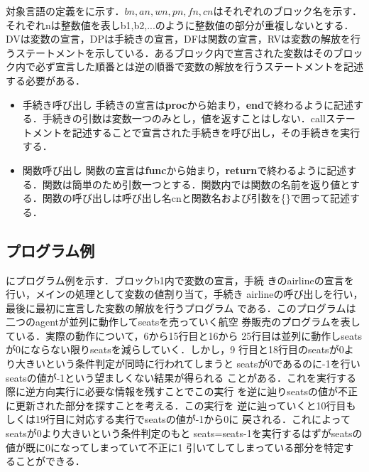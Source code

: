 \documentclass[submit,PRO]{ipsj}
\begin{document}
対象言語の定義をに示す．$bn,an,wn,pn,fn,cn$はそれぞれのブロック名を示す．それぞれnは整数値を表しb1,b2,...のように整数値の部分が重複しないとする．DVは変数の宣言，DPは手続きの宣言，DFは関数の宣言，RVは変数の解放を行うステートメントを示している．あるブロック内で宣言された変数はそのブロック内で必ず宣言した順番とは逆の順番で変数の解放を行うステートメントを記述する必要がある．

\begin{itemize}
\item
手続き呼び出し  手続きの宣言は{\bf proc}から始まり，{\bf end}で終わるように記述する．手続きの引数は変数一つのみとし，値を返すことはしない．callステートメントを記述することで宣言された手続きを呼び出し，その手続きを実行する．
\item
関数呼び出し  関数の宣言は{\bf func}から始まり，{\bf return}で終わるように記述する．関数は簡単のため引数一つとする．関数内では関数の名前を返り値とする．関数の呼び出しは呼び出し名cnと関数名および引数を\{\}で囲って記述する．
\end{itemize}

\subsection{プログラム例}

にプログラム例を示す．ブロックb1内で変数の宣言，手続
きのairlineの宣言を行い，メインの処理として変数の値割り当て，手続き
airlineの呼び出しを行い，最後に最初に宣言した変数の解放を行うプログラム
である．このプログラムは二つのagentが並列に動作してseatsを売っていく航空
券販売のプログラムを表している．実際の動作について，6から15行目と16から
25行目は並列に動作しseatsが0にならない限りseatsを減らしていく．しかし，9
行目と18行目のseatsが0より大きいという条件判定が同時に行われてしまうと
seatsが0であるのに-1を行いseatsの値が-1という望ましくない結果が得られる
ことがある．これを実行する際に逆方向実行に必要な情報を残すことでこの実行
を逆に辿りseatsの値が不正に更新された部分を探すことを考える．この実行を
逆に辿っていくと10行目もしくは19行目に対応する実行でseatsの値が-1から0に
戻される．これによってseatsが0より大きいという条件判定のもと
seats=seats-1を実行するはずがseatsの値が既に0になってしまっていて不正に1
引いてしてしまっている部分を特定することができる．
\end{document}
